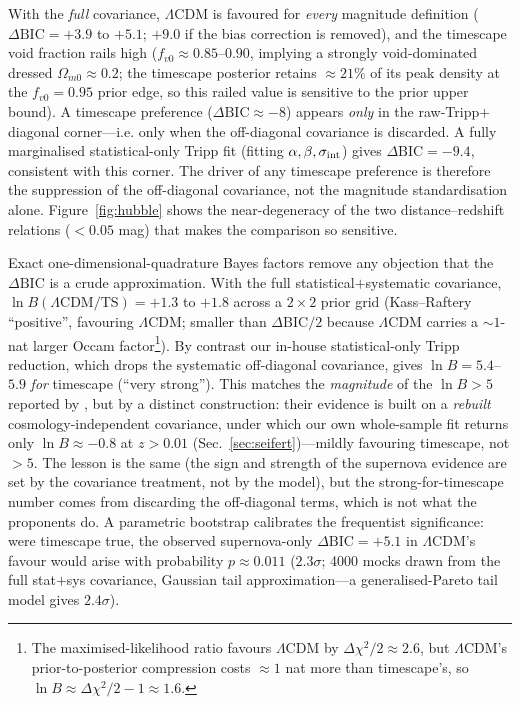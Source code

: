 \documentclass[aps,prd,twocolumn,nofootinbib,superscriptaddress,floatfix]{revtex4-2}
\newcommand{\fvo}{f_{v0}}
\newcommand{\Lcdm}{\Lambda\mathrm{CDM}}
\newcommand{\dBIC}{\Delta\mathrm{BIC}}
\begin{document}
With the \emph{full} covariance, $\Lcdm$ is favoured for \emph{every} magnitude
definition ($\dBIC=+3.9$ to $+5.1$; $+9.0$ if the bias correction is removed),
and the timescape void fraction rails high ($\fvo\approx0.85$--$0.90$, implying a
strongly void-dominated dressed $\Omega_{m0}\approx0.2$; the timescape posterior retains
$\approx21\%$ of its peak density at the $\fvo=0.95$ prior edge, so this railed value is
sensitive to the prior upper bound). A timescape preference
($\dBIC\approx-8$) appears \emph{only} in the raw-Tripp$+$diagonal corner---i.e.
only when the off-diagonal covariance is discarded. A fully marginalised
statistical-only Tripp fit (fitting $\alpha,\beta,\sigma_{\rm int}$) gives
$\dBIC=-9.4$, consistent with this corner. The driver of any timescape
preference is therefore the suppression of the off-diagonal covariance, not the
magnitude standardisation alone. Figure~\ref{fig:hubble} shows the
near-degeneracy of the two distance--redshift relations ($<0.05$ mag) that makes
the comparison so sensitive.

Exact one-dimensional-quadrature Bayes factors remove any objection that the
$\dBIC$ is a crude approximation. With the full statistical$+$systematic
covariance, $\ln B(\Lcdm/\mathrm{TS})=+1.3$ to $+1.8$ across a $2\times2$ prior
grid (Kass--Raftery ``positive'', favouring $\Lcdm$; smaller than $\dBIC/2$
because $\Lcdm$ carries a $\sim\!1$-nat larger Occam
factor\footnote{The maximised-likelihood ratio favours $\Lcdm$ by
$\Delta\chi^2/2\approx2.6$, but $\Lcdm$'s prior-to-posterior compression costs
$\approx1$ nat more than timescape's, so $\ln B\approx\Delta\chi^2/2-1\approx1.6$.}).
By contrast our in-house statistical-only Tripp reduction, which drops the systematic
off-diagonal covariance, gives $\ln B=5.4$--$5.9$ \emph{for} timescape (``very
strong''). This matches the \emph{magnitude} of the $\ln B>5$ reported by
\cite{Seifert2024}, but by a distinct construction: their evidence is built on a
\emph{rebuilt} cosmology-independent covariance, under which our own whole-sample fit
returns only $\ln B\approx-0.8$ at $z>0.01$ (Sec.~\ref{sec:seifert})---mildly favouring
timescape, not $>5$. The lesson is the same (the sign and strength of the supernova
evidence are set by the covariance treatment, not by the model), but the
strong-for-timescape number comes from discarding the off-diagonal terms, which is not
what the proponents do. A parametric bootstrap calibrates the frequentist significance:
were timescape true, the observed supernova-only $\dBIC=+5.1$ in $\Lcdm$'s favour
would arise with probability $p\approx0.011$ ($2.3\sigma$; 4000 mocks drawn from the
full stat$+$sys covariance, Gaussian tail approximation---a generalised-Pareto tail model
gives $2.4\sigma$).
\end{document}
